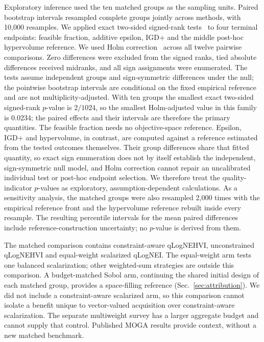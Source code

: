 \documentclass[aps,prab,reprint,superscriptaddress,amsmath,amssymb,floatfix]{revtex4-2}
\begin{document}
Exploratory inference used the ten matched groups as the sampling units. Paired bootstrap
intervals resampled complete groups jointly across methods, with 10,000 resamples. We applied
exact two-sided signed-rank tests~\cite{Wilcoxon1945} to four terminal endpoints: feasible
fraction, additive epsilon, IGD+ and the middle post-hoc hypervolume reference. We used Holm
correction~\cite{Holm1979} across all twelve pairwise comparisons. Zero differences were
excluded from the signed ranks, tied absolute differences received midranks, and all sign
assignments were enumerated. The tests assume independent groups and sign-symmetric differences
under the null; the pointwise bootstrap intervals are conditional on the fixed empirical
reference and are not multiplicity-adjusted. With ten groups the smallest exact two-sided
signed-rank $p$-value is $2/1024$, so the smallest Holm-adjusted value in this family is 0.0234;
the paired effects and their intervals are therefore the primary quantities. The feasible
fraction needs no objective-space reference. Epsilon, IGD+ and hypervolume, in contrast, are
computed against a reference estimated from the tested outcomes themselves. Their group
differences share that fitted quantity, so exact sign enumeration does not by itself establish
the independent, sign-symmetric null model, and Holm correction cannot repair an uncalibrated
individual test or post-hoc endpoint selection. We therefore treat the quality-indicator
$p$-values as exploratory, assumption-dependent calculations. As a sensitivity analysis, the
matched groups were also resampled 2,000 times with the empirical reference front and the
hypervolume reference rebuilt inside every resample. The resulting percentile intervals for the
mean paired differences include reference-construction uncertainty; no $p$-value is derived from
them.


The matched comparison contains constraint-aware qLogNEHVI, unconstrained qLogNEHVI and
equal-weight scalarized qLogNEI. The equal-weight arm tests one balanced scalarization; other
weighted-sum strategies are outside this comparison. A budget-matched Sobol arm, continuing the
shared initial design of each matched group, provides a space-filling reference
(Sec.~\ref{sec:attribution}). We did not include a constraint-aware scalarized arm, so this
comparison cannot isolate a benefit unique to vector-valued acquisition over constraint-aware
scalarization. The separate multiweight survey has a larger aggregate budget and cannot supply
that control. Published MOGA results provide context, without a new matched benchmark.
\end{document}
